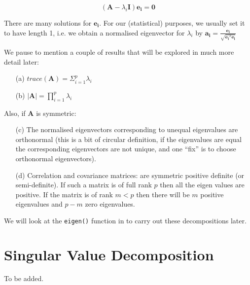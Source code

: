 \begin{displaymath}
(\boldsymbol{A} - \lambda_{i} \boldsymbol{I})\boldsymbol{e_{i}} = \boldsymbol{0}
\end{displaymath}

There are many solutions for $\boldsymbol{e_{i}}$.   For our (statistical) purposes, we usually set it to have length 1, i.e. we obtain a normalised eigenvector for $\lambda_{i}$ by $\boldsymbol{a_{i}} = \frac{\boldsymbol{e_{i}}}{\sqrt{\boldsymbol{e_{i}}^{T}\boldsymbol{e_{i}}}}$

We pause to mention a couple of results that will be explored in much more detail later:
\begin{itemize}
\item[(a)] $trace(\boldsymbol{A}) = \Sigma_{i = 1}^{p} \lambda_{i}$

\item[(b)] $|\boldsymbol{A}| = \prod_{i = 1}^{p} \lambda_{i}$
\end{itemize}

Also, if $\boldsymbol{A}$ is symmetric:

\begin{itemize}
\item[(c)] The normalised eigenvectors corresponding to unequal eigenvalues are orthonormal   (this is a bit of circular definition, if the eigenvalues are equal the corresponding eigenvectors are not unique, and one ``fix'' is to choose orthonormal eigenvectors).
\item[(d)] Correlation and covariance matrices: are symmetric positive definite (or semi-definite).   If such a matrix is of full rank $p$ then all the eigen values are positive.   If the matrix is of rank $m < p$ then there will be $m$ positive eigenvalues and $p-m$ zero eigenvalues.
\end{itemize}

We will look at the \texttt{eigen()} function in \R to carry out these decompositions later.


\section{Singular Value Decomposition}
\label{svd}

To be added.


